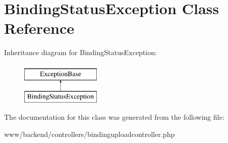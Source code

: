 \hypertarget{classBindingStatusException}{
\section{BindingStatusException Class Reference}
\label{classBindingStatusException}
}
Inheritance diagram for BindingStatusException:\begin{figure}[H]
\begin{center}
\leavevmode
\includegraphics[height=2.000000cm]{classBindingStatusException}
\end{center}
\end{figure}


The documentation for this class was generated from the following file:\begin{DoxyCompactItemize}
\item 
www/backend/controllers/bindinguploadcontroller.php\end{DoxyCompactItemize}
